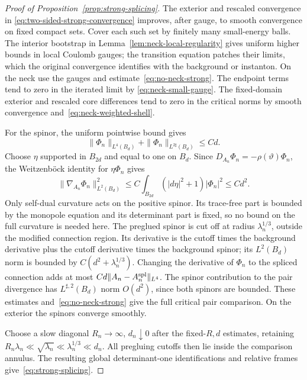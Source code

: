 \documentclass[11pt]{amsart}
\theoremstyle{definition}
\theoremstyle{remark}
\theoremstyle{plain}
\begin{document}
\begin{proof}[Proof of Proposition~\ref{prop:strong-splicing}]
The exterior and rescaled convergence in
\eqref{eq:two-sided-strong-convergence} improves, after gauge, to smooth
convergence on fixed compact sets.  Cover each such set by finitely
many small-energy balls.  The interior bootstrap in
Lemma~\ref{lem:neck-local-regularity} gives uniform higher bounds
in local Coulomb gauges; the transition equation patches their limits,
which the original convergence identifies with the background or
instanton.  On the neck use
the gauges and estimate~\eqref{eq:no-neck-strong}.  The endpoint
terms tend to zero in the iterated limit by
\eqref{eq:neck-small-gauge}.  The fixed-domain exterior and rescaled
core differences tend to zero in the critical norms by smooth
convergence and~\eqref{eq:neck-weighted-shell}.

For the spinor, the uniform pointwise bound gives
\[
 \|\Phi_n\|_{L^4(B_d)}+\|\Phi_n\|_{L^{2\sharp}(B_d)}\le Cd.
\]
Choose $\eta$ supported in $B_{2d}$ and equal to one on $B_d$.
Since $D_{A_n}\Phi_n=-\rho(\vartheta)\Phi_n$, the
Weitzenb\"ock identity for $\eta\Phi_n$ gives
\begin{equation}\label{eq:neck-spinor-energy}
 \|\nabla_{A_n}\Phi_n\|_{L^2(B_d)}^2
 \le C\int_{B_{2d}}(|d\eta|^2+1)|\Phi_n|^2\le Cd^2.
\end{equation}
Only self-dual curvature acts on the positive spinor.  Its trace-free
part is bounded by the monopole equation and its determinant part
is fixed, so no bound on the full curvature is needed here.
The preglued spinor is cut off at radius $\lambda_n^{1/3}$,
outside the modified connection region.  Its derivative is the
cutoff times the background derivative plus the cutoff derivative
times the background spinor; its $L^2(B_d)$ norm is bounded by
$C(d^2+\lambda_n^{1/3})$.  Changing the derivative of $\Phi_n$
to the spliced connection adds at most
$Cd\|A_n-A_n^{\rm spl}\|_{L^4}$.
The spinor contribution to the pair divergence has
$L^{\sharp,2}(B_d)$ norm $O(d^2)$, since both spinors are bounded.
These estimates and~\eqref{eq:no-neck-strong} give the full critical
pair comparison.  On the exterior the spinors converge smoothly.

Choose a slow diagonal $R_n\to\infty$, $d_n\downarrow0$ after
the fixed-$R,d$ estimates, retaining
$R_n\lambda_n\ll\sqrt{\lambda_n}\ll\lambda_n^{1/3}\ll d_n$.
All pregluing cutoffs then lie inside the comparison annulus.
The resulting global determinant-one identifications and relative
frames give~\eqref{eq:strong-splicing}.
\end{proof}
\end{document}
